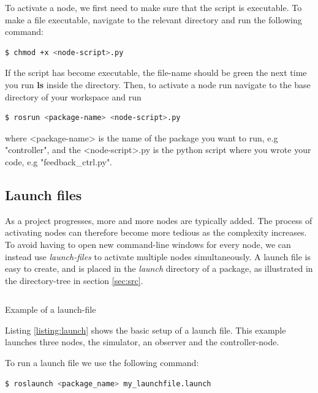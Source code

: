 \documentclass{ol-softwaremanual}
\begin{document}
To activate a node, we first need to make sure that the script is executable. To make a file executable, navigate to the relevant directory and run the following command: 

\begin{lstlisting}[language=bash,basicstyle=\mlttfamily, breaklines=true]
  $ chmod +x <node-script>.py
\end{lstlisting}

If the script has become executable, the file-name should be green the next time you run \textbf{ls} inside the directory. Then, to activate a node run navigate to the base directory of your workspace and run 

\begin{lstlisting}[language=bash,basicstyle=\mlttfamily, breaklines=true]
  $ rosrun <package-name> <node-script>.py
\end{lstlisting}

where <package-name> is the name of the package you want to run, e.g "controller", and the <node-script>.py is the python script where you wrote your code, e.g "feedback\_ctrl.py".


\subsection{Launch files}

As a project progresses, more and more nodes are typically added. The process of activating nodes can therefore become more tedious as the complexity increases. To avoid having to open new command-line windows for every node, we can instead use \textit{launch-files} to activate multiple nodes simultaneously. A launch file is easy to create, and is placed in the \textit{launch} directory of a package, as illustrated in the directory-tree in section \ref{sec:src}.

\begin{listing}[h]
\inputminted{octave}{code/example.launch}
\caption{Example of a launch-file}
\label{listing:launch}
\end{listing}

Listing \ref{listing:launch} shows the basic setup of a launch file. This example launches three nodes, the simulator, an observer and the controller-node. 

To run a launch file we use the following command: 

\begin{lstlisting}[language=bash,basicstyle=\mlttfamily, breaklines=true]
  $ roslaunch <package_name> my_launchfile.launch  
\end{lstlisting} 
\end{document}
